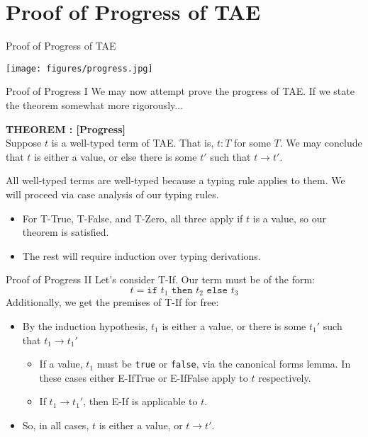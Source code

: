 \documentclass[11pt]{beamer}
\begin{document}
\section[Progress]{Proof of Progress of TAE}
\begin{frame}[fragile=singleslide]{Proof of Progress of TAE}
\begin{center}
\texttt{[image: figures/progress.jpg]}
\end{center}
\end{frame}

\begin{frame}[fragile=singleslide]{Proof of Progress I}
We may now attempt prove the progress of TAE.  If we state the theorem somewhat more rigorously... \\ 
\vspace{1em}

\textbf{THEOREM : [Progress]} \\
Suppose $t$ is a well-typed term of TAE.  That is, $t : T$ for some $T$.  We may conclude that $t$ is either a value, or else there is some $t'$ such that $t \rightarrow t'$.  \\ 
\vspace{1em}

All well-typed terms are well-typed because a typing rule applies to them.  We will proceed via case analysis of our typing rules.  
\begin{itemize}
\item For T-True, T-False, and T-Zero, all three apply if $t$ is a value, so our theorem is satisfied.
\item The rest will require induction over typing derivations.
\end{itemize}
\end{frame}

\begin{frame}[fragile=singleslide]{Proof of Progress II}
Let's consider T-If.  Our term must be of the form:
\begin{equation}
t = \texttt{if } t_1 \texttt{ then } t_2 \texttt{ else } t_3
\end{equation}
Additionally, we get the premises of T-If for free:

\begin{itemize}
\item By the induction hypothesis, $t_1$ is either a value, or there is some $t_1'$ such that $t_1 \rightarrow t_1'$
\begin{itemize}
\item If a value, $t_1$ must be \texttt{true} or \texttt{false}, via the canonical forms lemma. In these cases either E-IfTrue or E-IfFalse apply to $t$ respectively.
\item If $t_1 \rightarrow t_1'$, then E-If is applicable to $t$.  
\end{itemize}
\item So, in all cases, $t$ is either a value, or $t \rightarrow t'$.   
\end{itemize}
\end{frame}
\end{document}

